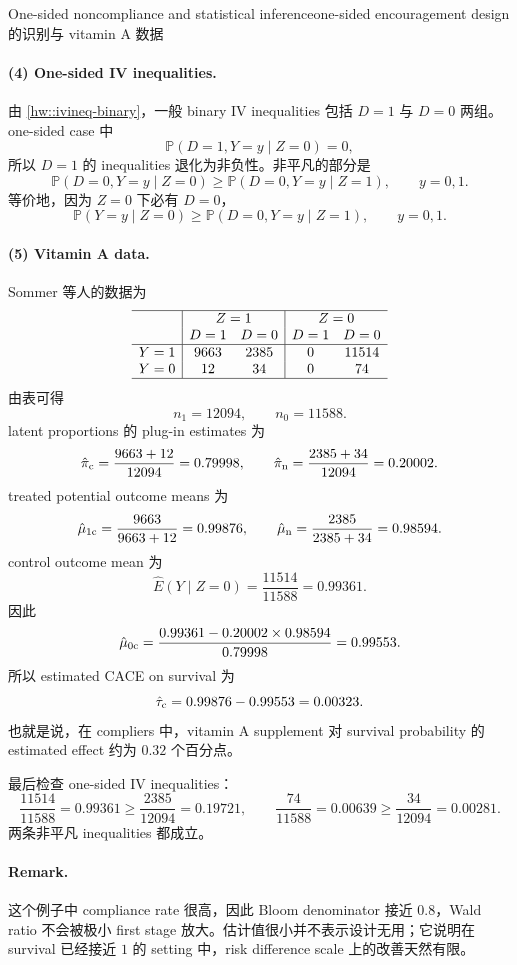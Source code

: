 \begin{exercisesolution}{One-sided noncompliance and statistical inference}{one-sided encouragement design 的识别与 vitamin A 数据}
\paragraph{(4) One-sided IV inequalities.}
由 \cref{hw::ivineq-binary}，一般 binary IV inequalities 包括 $D=1$ 与 $D=0$ 两组。one-sided case 中
\[
\mathbb{P}(D=1,Y=y\mid Z=0)=0,
\]
所以 $D=1$ 的 inequalities 退化为非负性。非平凡的部分是
\[
\mathbb{P}(D=0,Y=y\mid Z=0)
\geq
\mathbb{P}(D=0,Y=y\mid Z=1),
\qquad y=0,1.
\]
等价地，因为 $Z=0$ 下必有 $D=0$，
\[
\mathbb{P}(Y=y\mid Z=0)
\geq
\mathbb{P}(D=0,Y=y\mid Z=1),
\qquad y=0,1.
\]

\paragraph{(5) Vitamin A data.}
Sommer 等人的数据为
\[
\begin{array}{c|cc|cc}
\hline
& \multicolumn{2}{c|}{Z=1} & \multicolumn{2}{c}{Z=0}\\
& D=1 & D=0 & D=1 & D=0\\
\hline
Y=1 & 9663 & 2385 & 0 & 11514\\
Y=0 & 12 & 34 & 0 & 74\\
\hline
\end{array}
\]
由表可得
\[
n_1=12094,\qquad n_0=11588.
\]
latent proportions 的 plug-in estimates 为
\[
\hat\pi_{\textup{c}}=\frac{9663+12}{12094}=0.79998,
\qquad
\hat\pi_{\textup{n}}=\frac{2385+34}{12094}=0.20002.
\]
treated potential outcome means 为
\[
\hat\mu_{1\textup{c}}=\frac{9663}{9663+12}=0.99876,
\qquad
\hat\mu_{\textup{n}}=\frac{2385}{2385+34}=0.98594.
\]
control outcome mean 为
\[
\hat E(Y\mid Z=0)=\frac{11514}{11588}=0.99361.
\]
因此
\[
\hat\mu_{0\textup{c}}
=
\frac{0.99361-0.20002\times 0.98594}{0.79998}
=0.99553.
\]
所以 estimated CACE on survival 为
\[
\hat\tau_{\textup{c}}
=0.99876-0.99553
=0.00323.
\]
也就是说，在 compliers 中，vitamin A supplement 对 survival probability 的 estimated effect 约为 $0.32$ 个百分点。

最后检查 one-sided IV inequalities：
\[
\frac{11514}{11588}=0.99361
\geq
\frac{2385}{12094}=0.19721,
\qquad
\frac{74}{11588}=0.00639
\geq
\frac{34}{12094}=0.00281.
\]
两条非平凡 inequalities 都成立。

\paragraph{Remark.}
这个例子中 compliance rate 很高，因此 Bloom denominator 接近 $0.8$，Wald ratio 不会被极小 first stage 放大。估计值很小并不表示设计无用；它说明在 survival 已经接近 $1$ 的 setting 中，risk difference scale 上的改善天然有限。
\end{exercisesolution}

